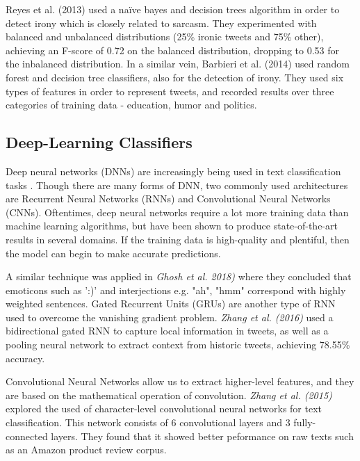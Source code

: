 \documentclass[12pt,a4paper]{article}
\begin{document}
Reyes et al. (2013) \cite{reyes2013multidimensional} used a na\"{i}ve bayes and decision trees algorithm in order to detect irony which is closely related to sarcasm. They experimented with balanced and unbalanced distributions (25\% ironic tweets and 75\% other), achieving an F-score of 0.72 on the balanced distribution, dropping to 0.53 for the inbalanced distribution. In a similar vein, Barbieri et al. (2014) \cite{barbieri2014modelling} used random forest and decision tree classifiers, also for the detection of irony. They used six types of features in order to represent tweets, and recorded results over three categories of training data - education, humor and politics.



\subsection{Deep-Learning Classifiers}\vspace{-10pt}
Deep neural networks (DNNs) are increasingly being used in text classification tasks \cite{zhang2015character, poria2016deeper}. Though there are many forms of DNN, two commonly used architectures are Recurrent Neural Networks (RNNs) and Convolutional Neural Networks (CNNs). Oftentimes, deep neural networks require a lot more training data than machine learning algorithms, but have been shown to produce state-of-the-art results in several domains. If the training data is high-quality and plentiful, then the model can begin to make accurate predictions. 




 A similar technique was applied in \textit{Ghosh et al. 2018)} \cite{ghosh2018sarcasm} where they concluded that emoticons such as ':)' and interjections e.g. "ah", "hmm" correspond with highly weighted sentences. Gated Recurrent Units (GRUs) are another type of RNN used to overcome the vanishing gradient problem.  \textit{Zhang et al. (2016)} \cite{zhang2016tweet} used a bidirectional gated RNN to capture local information in tweets, as well as a pooling neural network to extract context from historic tweets, achieving 78.55\% accuracy.

Convolutional Neural Networks allow us to extract higher-level features, and they are based on the mathematical operation of convolution. \textit{Zhang et al. (2015)}  \cite{zhang2015character} explored the used of character-level convolutional neural networks for text classification. This network consists of 6 convolutional layers and 3 fully-connected layers. They found that it showed better peformance on raw texts such as an Amazon product review corpus.
\end{document}
